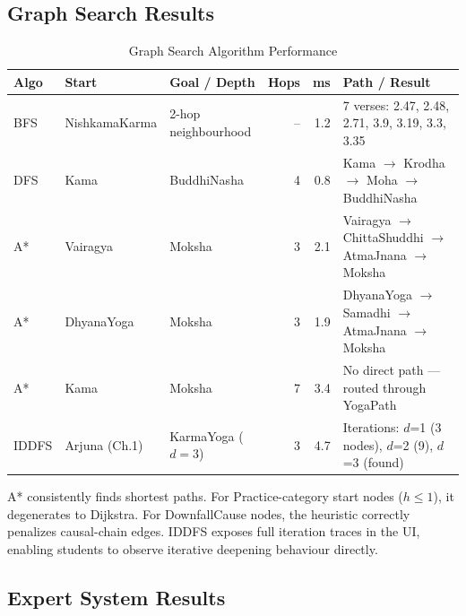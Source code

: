 \documentclass[conference]{IEEEtran}
\begin{document}
\subsection{Graph Search Results}

\begin{table}[htbp]
\caption{Graph Search Algorithm Performance}
\label{tab:search}
\centering
\begin{tabular}{llp{3.2cm}rrl}
\toprule
\textbf{Algo} & \textbf{Start} & \textbf{Goal / Depth} & \textbf{Hops} & \textbf{ms} & \textbf{Path / Result} \\
\midrule
BFS   & NishkamaKarma & 2-hop neighbourhood   & -- & 1.2 & 7 verses: 2.47, 2.48, 2.71, 3.9, 3.19, 3.3, 3.35 \\
DFS   & Kama          & BuddhiNasha           &  4 & 0.8 & Kama $\to$ Krodha $\to$ Moha $\to$ BuddhiNasha \\
A*    & Vairagya      & Moksha                &  3 & 2.1 & Vairagya $\to$ ChittaShuddhi $\to$ AtmaJnana $\to$ Moksha \\
A*    & DhyanaYoga    & Moksha                &  3 & 1.9 & DhyanaYoga $\to$ Samadhi $\to$ AtmaJnana $\to$ Moksha \\
A*    & Kama          & Moksha                &  7 & 3.4 & No direct path — routed through YogaPath \\
IDDFS & Arjuna (Ch.1) & KarmaYoga ($d = 3$)   &  3 & 4.7 & Iterations: $d$=1 (3 nodes), $d$=2 (9), $d$=3 (found) \\
\bottomrule
\end{tabular}
\end{table}

A* consistently finds shortest paths. For Practice-category start nodes
($h \leq 1$), it degenerates to Dijkstra. For DownfallCause nodes, the
heuristic correctly penalizes causal-chain edges. IDDFS exposes full
iteration traces in the UI, enabling students to observe iterative
deepening behaviour directly.

\subsection{Expert System Results}
\end{document}
